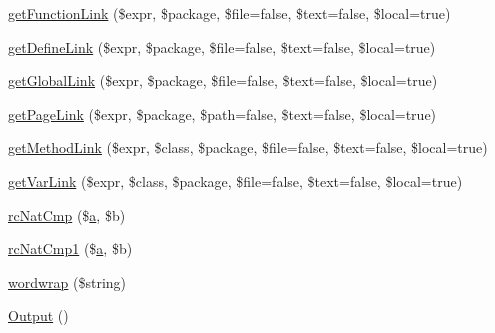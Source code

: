 \begin{DoxyCompactItemize}
\hyperlink{class_x_m_l_doc_bookpeardoc2_converter_af86fc0c291312dfb7535ecc91f4e84b2}{get\-Function\-Link} (\$expr, \$package, \$file=false, \$text=false, \$local=true)
\item 
\hyperlink{class_x_m_l_doc_bookpeardoc2_converter_aa5c57990ec6adfbcae5fcc7bc306f615}{get\-Define\-Link} (\$expr, \$package, \$file=false, \$text=false, \$local=true)
\item 
\hyperlink{class_x_m_l_doc_bookpeardoc2_converter_a33bb7dbf96c53bd3023b3c1202f71aaf}{get\-Global\-Link} (\$expr, \$package, \$file=false, \$text=false, \$local=true)
\item 
\hyperlink{class_x_m_l_doc_bookpeardoc2_converter_a3cbc4d05d935c1cc162d401cf9351592}{get\-Page\-Link} (\$expr, \$package, \$path=false, \$text=false, \$local=true)
\item 
\hyperlink{class_x_m_l_doc_bookpeardoc2_converter_afad45ed8b83eebbcd771bf9670eb6f24}{get\-Method\-Link} (\$expr, \$class, \$package, \$file=false, \$text=false, \$local=true)
\item 
\hyperlink{class_x_m_l_doc_bookpeardoc2_converter_ab17ce6d4f7e64064435e6cd67b7f7bad}{get\-Var\-Link} (\$expr, \$class, \$package, \$file=false, \$text=false, \$local=true)
\item 
\hyperlink{class_x_m_l_doc_bookpeardoc2_converter_a669301a557a996bf338badc5ca253156}{rc\-Nat\-Cmp} (\$\hyperlink{classa}{a}, \$b)
\item 
\hyperlink{class_x_m_l_doc_bookpeardoc2_converter_ac75bdbfec92cd3025b5bdb5f60e14970}{rc\-Nat\-Cmp1} (\$\hyperlink{classa}{a}, \$b)
\item 
\hyperlink{class_x_m_l_doc_bookpeardoc2_converter_ae6b662b379df62d2901eae5f6b4b4672}{wordwrap} (\$string)
\item 
\hyperlink{class_x_m_l_doc_bookpeardoc2_converter_a356172c336fe8c0afbac8c49d5dcc703}{\-Output} ()
\end{DoxyCompactItemize}
